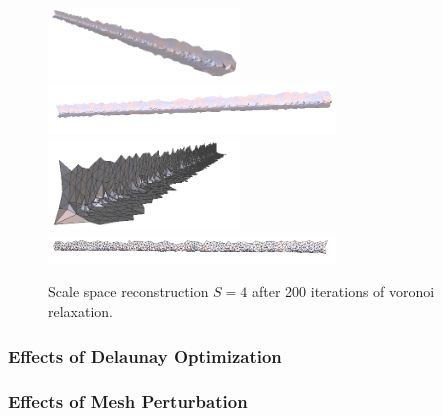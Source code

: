 \documentclass[12pt]{drexelthesis}
\let\Oldsubsubsection\subsubsection
\renewcommand{\subsubsection}{\FloatBarrier\Oldsubsubsection}
\begin{document}
\begin{figure}[!ht]
	\centering
		\includegraphics[width=2in]{simulated-lab-scan/0noise/optimized/scalespace4Lloyd30s200it00.png}
		\includegraphics[width=3in]{simulated-lab-scan/0noise/optimized/scalespace4Lloyd30s200it01.png}
		\includegraphics[width=2in]{simulated-lab-scan/0noise/optimized/scalespace4Lloyd30s200it02.png}
		\includegraphics[width=3in]{simulated-lab-scan/0noise/optimized/scalespace4Lloyd30s200it03.png}
		\caption[Scale space reconstruction $S = 4$ after 200 iterations of voronoi relaxation]{\centering Scale space reconstruction $S = 4$ after 200 iterations of voronoi relaxation.}
	\label{zeronoise:scalespace4lloyd}
\end{figure}

\subsubsection{Effects of Delaunay Optimization}


\subsubsection{Effects of Mesh Perturbation}
\end{document}
